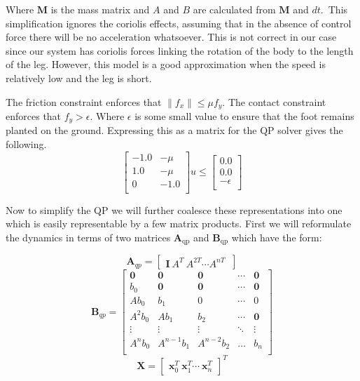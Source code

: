 \documentclass[conference]{IEEEtran}
\begin{document}
Where \(\mathbf{M}\) is the mass matrix and \(A\) and \(B\) are calculated from \(\mathbf{M}\) and \(dt\).\
This simplification ignores the coriolis effects, assuming that in the absence of control force there will be no acceleration whatsoever.
This is not correct in our case since our system has coriolis forces linking the rotation of the body to the length of the leg.
However, this model is a good approximation when the speed is relatively low and the leg is short.

The friction constraint enforces that \(\|f_x\| \leq \mu f_y\).
The contact constraint  enforces that \(f_y > \epsilon\).
Where \(\epsilon\) is some small value to ensure that the foot remains planted on the ground.
Expressing this as a matrix for the QP solver gives the following.
\[
    \begin{bmatrix}
        -1.0 & -\mu \\
        1.0  & -\mu \\
        0    & -1.0 \\
    \end{bmatrix} u \leq \begin{bmatrix}
        0.0       \\
        0.0       \\
        -\epsilon \\
    \end{bmatrix}
\]

Now to simplify the QP we will further coalesce these representations into one which is easily representable by a few matrix products.
First we will reformulate the dynamics in terms of two matrices \(\mathbf{A}_\text{qp}\) and \(\mathbf{B}_\text{qp}\) which have the form:

\[\mathbf{A}_{qp} = \begin{bmatrix} \mathbf{I}\: A^T\: A^{2T} \cdots A^{nT}\: \end{bmatrix}\]
\[
    \mathbf{B}_{qp} = \begin{bmatrix}
        \mathbf{0} & \mathbf{0} & \mathbf{0} & \cdots & \mathbf{0} \\
        b_0        & \mathbf{0} & \mathbf{0} & \cdots & \mathbf{0} \\
        Ab_0       & b_1        & 0          & \cdots & 0          \\
        A^2b_0     & Ab_1       & b_2        & \cdots & \mathbf{0} \\
        \vdots     & \vdots     & \vdots     & \ddots & \vdots     \\
        A^nb_0     & A^{n-1}b_1 & A^{n-2}b_2 & \hdots & b_n        \\
    \end{bmatrix}
\]
\[\mathbf{X} = \left[\begin{smallmatrix} \mathbf{x}_0^T\: \mathbf{x}_1^T \cdots\: \mathbf{x}_n^T\end{smallmatrix} \right]^T\]
\end{document}
